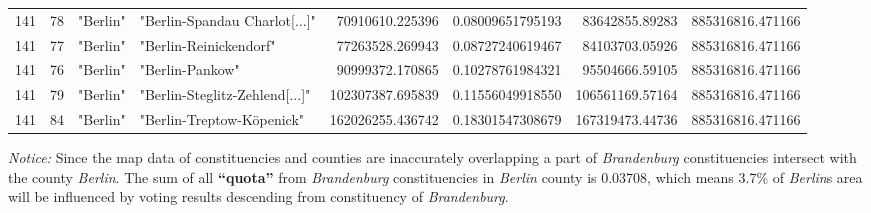 \begin{table}[h]
{\begin{tabular}{|c|c|l|l|r|r|r|r|}
141	  &	78   		 &	"Berlin"     &	"Berlin-Spandau Charlot{[}...{]}"   &	 70910610.225396   &	0.08009651795193   &	  83642855.89283   &	885316816.471166 \\ 
141	  &	77    		 &	"Berlin"     &	"Berlin-Reinickendorf"		 &	 77263528.269943   &	0.08727240619467   &	  84103703.05926   &	885316816.471166 \\ 
141	  &	76    		 &	"Berlin"     &	"Berlin-Pankow"			 &	 90999372.170865   &	0.10278761984321   &	  95504666.59105   &	885316816.471166 \\ 
141	  &	79    		 &	"Berlin"     &	"Berlin-Steglitz-Zehlend{[}...{]}"   &	102307387.695839   &	0.11556049918550   &	 106561169.57164   &	885316816.471166 \\ 
141	  &	84    		 &	"Berlin"     &	"Berlin-Treptow-K\"openick"	 &	162026255.436742   &	0.18301547308679   &	 167319473.44736   &	885316816.471166 \\  \hline 
             
\end{tabular}
}
\end{table}


\emph{Notice:} Since the map data of constituencies and counties are
inaccurately overlapping a part of \emph{Brandenburg} constituencies
intersect with the county \emph{Berlin}. The sum of all
\textbf{``quota''} from \emph{Brandenburg} constituencies in
\emph{Berlin} county is 0.03708, which means 3.7\% of \emph{Berlin}s
area will be influenced by voting results descending from constituency
of \emph{Brandenburg}.

